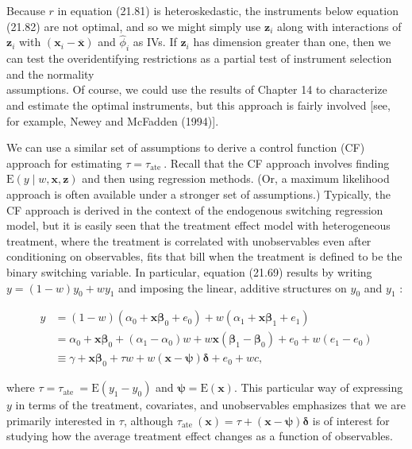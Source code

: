 \documentclass[10pt]{article}
\begin{document}
Because $r$ in equation (21.81) is heteroskedastic, the instruments below equation (21.82) are not optimal, and so we might simply use $\mathbf{z}_{i}$ along with interactions of $\mathbf{z}_{i}$ with $\left(\mathbf{x}_{i}-\overline{\mathbf{x}}\right)$ and $\hat{\phi}_{i}$ as IVs. If $\mathbf{z}_{i}$ has dimension greater than one, then we can test the overidentifying restrictions as a partial test of instrument selection and the normality\\[0pt]
assumptions. Of course, we could use the results of Chapter 14 to characterize and estimate the optimal instruments, but this approach is fairly involved [see, for example, Newey and McFadden (1994)].

We can use a similar set of assumptions to derive a control function (CF) approach for estimating $\tau=\tau_{\text {ate }}$. Recall that the CF approach involves finding $\mathrm{E}(y \mid w, \mathbf{x}, \mathbf{z})$ and then using regression methods. (Or, a maximum likelihood approach is often available under a stronger set of assumptions.) Typically, the CF approach is derived in the context of the endogenous switching regression model, but it is easily seen that the treatment effect model with heterogeneous treatment, where the treatment is correlated with unobservables even after conditioning on observables, fits that bill when the treatment is defined to be the binary switching variable. In particular, equation (21.69) results by writing $y=(1-w) y_{0}+w y_{1}$ and imposing the linear, additive structures on $y_{0}$ and $y_{1}$ :

$$
\begin{aligned}
y & =(1-w)\left(\alpha_{0}+\mathbf{x} \boldsymbol{\beta}_{0}+e_{0}\right)+w\left(\alpha_{1}+\mathbf{x} \boldsymbol{\beta}_{1}+e_{1}\right) \\
& =\alpha_{0}+\mathbf{x} \boldsymbol{\beta}_{0}+\left(\alpha_{1}-\alpha_{0}\right) w+w \mathbf{x}\left(\boldsymbol{\beta}_{1}-\boldsymbol{\beta}_{0}\right)+e_{0}+w\left(e_{1}-e_{0}\right) \\
& \equiv \gamma+\mathbf{x} \boldsymbol{\beta}_{0}+\tau w+w(\mathbf{x}-\boldsymbol{\psi}) \boldsymbol{\delta}+e_{0}+w c,
\end{aligned}
$$

where $\tau=\tau_{\text {ate }}=\mathrm{E}\left(y_{1}-y_{0}\right)$ and $\boldsymbol{\psi}=\mathrm{E}(\mathbf{x})$. This particular way of expressing $y$ in terms of the treatment, covariates, and unobservables emphasizes that we are primarily interested in $\tau$, although $\tau_{\text {ate }}(\mathbf{x})=\tau+(\mathbf{x}-\boldsymbol{\psi}) \boldsymbol{\delta}$ is of interest for studying how the average treatment effect changes as a function of observables.
\end{document}

